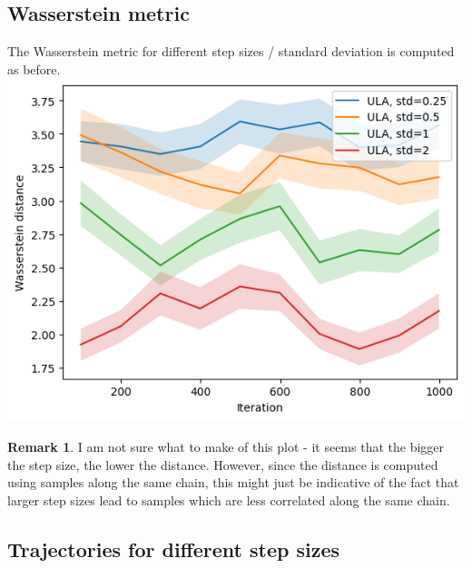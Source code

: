 \documentclass{article}
\theoremstyle{definition}
\newtheorem*{remark}{Remark}
\newcommand{\1}{\mathbbm{1}}
\begin{document}
\subsection{Wasserstein metric}
The Wasserstein metric for different step sizes / standard deviation is computed as before. \\
\includegraphics[width=0.8\linewidth,valign=m]{Different variance/var_plot.png}\\
\begin{remark}
	I am not sure what to make of this plot - it seems that the bigger the step size, the lower the distance. However, since the distance is computed using samples along the same chain, this might just be indicative of the fact that larger step sizes lead to samples which are less correlated along the same chain.
\end{remark}
\subsection{Trajectories for different step sizes}
\end{document}
